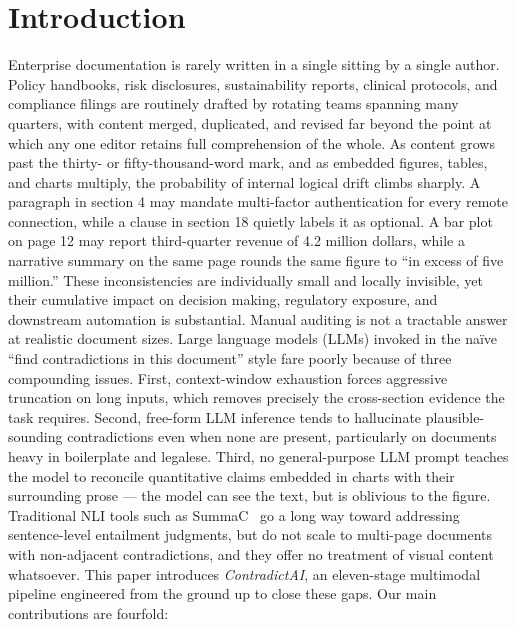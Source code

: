 \documentclass[conference]{IEEEtran}
\begin{document}
\section{Introduction}
Enterprise documentation is rarely written in a single sitting by a single author. Policy handbooks, risk disclosures, sustainability reports, clinical protocols, and compliance filings are routinely drafted by rotating teams spanning many quarters, with content merged, duplicated, and revised far beyond the point at which any one editor retains full comprehension of the whole. As content grows past the thirty- or fifty-thousand-word mark, and as embedded figures, tables, and charts multiply, the probability of internal logical drift climbs sharply. A paragraph in section 4 may mandate multi-factor authentication for every remote connection, while a clause in section 18 quietly labels it as optional. A bar plot on page 12 may report third-quarter revenue of 4.2 million dollars, while a narrative summary on the same page rounds the same figure to ``in excess of five million.'' These inconsistencies are individually small and locally invisible, yet their cumulative impact on decision making, regulatory exposure, and downstream automation is substantial.
Manual auditing is not a tractable answer at realistic document sizes. Large language models (LLMs) invoked in the na\"{i}ve ``find contradictions in this document'' style fare poorly because of three compounding issues. First, context-window exhaustion forces aggressive truncation on long inputs, which removes precisely the cross-section evidence the task requires. Second, free-form LLM inference tends to hallucinate plausible-sounding contradictions even when none are present, particularly on documents heavy in boilerplate and legalese. Third, no general-purpose LLM prompt teaches the model to reconcile quantitative claims embedded in charts with their surrounding prose --- the model can see the text, but is oblivious to the figure. Traditional NLI tools such as SummaC~\cite{b1} go a long way toward addressing sentence-level entailment judgments, but do not scale to multi-page documents with non-adjacent contradictions, and they offer no treatment of visual content whatsoever.
This paper introduces \emph{ContradictAI}, an eleven-stage multimodal pipeline engineered from the ground up to close these gaps. Our main contributions are fourfold:
\end{document}
